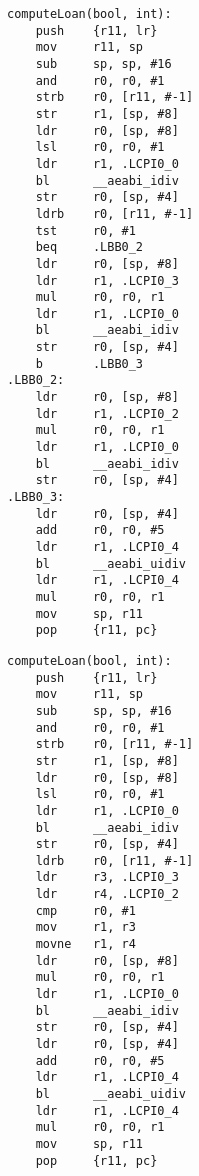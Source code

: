 \begin{minipage}{0.45\textwidth}
    \begin{lstlisting}[style=AsmStyle, basicstyle=\fontsize{4}{5}\selectfont\ttfamily]
computeLoan(bool, int):
    push    {r11, lr}
    mov     r11, sp
    sub     sp, sp, #16
    and     r0, r0, #1
    strb    r0, [r11, #-1]
    str     r1, [sp, #8]
    ldr     r0, [sp, #8]
    lsl     r0, r0, #1
    ldr     r1, .LCPI0_0
    bl      __aeabi_idiv
    str     r0, [sp, #4]
    ldrb    r0, [r11, #-1]
    tst     r0, #1
    beq     .LBB0_2
    ldr     r0, [sp, #8]
    ldr     r1, .LCPI0_3
    mul     r0, r0, r1
    ldr     r1, .LCPI0_0
    bl      __aeabi_idiv
    str     r0, [sp, #4]
    b       .LBB0_3
.LBB0_2:
    ldr     r0, [sp, #8]
    ldr     r1, .LCPI0_2
    mul     r0, r0, r1
    ldr     r1, .LCPI0_0
    bl      __aeabi_idiv
    str     r0, [sp, #4]
.LBB0_3:
    ldr     r0, [sp, #4]
    add     r0, r0, #5
    ldr     r1, .LCPI0_4
    bl      __aeabi_uidiv
    ldr     r1, .LCPI0_4
    mul     r0, r0, r1
    mov     sp, r11
    pop     {r11, pc}
    \end{lstlisting}
\end{minipage}%
\hspace{1cm}
\begin{minipage}{0.45\textwidth}
    \begin{lstlisting}[numbers=right, basicstyle=\fontsize{4}{5}\selectfont\ttfamily\color{white}, belowskip=8.5\baselineskip]
computeLoan(bool, int):
    push    {r11, lr}
    mov     r11, sp
    sub     sp, sp, #16
    and     r0, r0, #1
    strb    r0, [r11, #-1]
    str     r1, [sp, #8]
    ldr     r0, [sp, #8]
    lsl     r0, r0, #1
    ldr     r1, .LCPI0_0
    bl      __aeabi_idiv
    str     r0, [sp, #4]
    ldrb    r0, [r11, #-1]
    ldr     r3, .LCPI0_3
    ldr     r4, .LCPI0_2
    cmp     r0, #1
    mov     r1, r3
    movne   r1, r4
    ldr     r0, [sp, #8]
    mul     r0, r0, r1
    ldr     r1, .LCPI0_0
    bl      __aeabi_idiv
    str     r0, [sp, #4]
    ldr     r0, [sp, #4]
    add     r0, r0, #5
    ldr     r1, .LCPI0_4
    bl      __aeabi_uidiv
    ldr     r1, .LCPI0_4
    mul     r0, r0, r1
    mov     sp, r11
    pop     {r11, pc} 
    \end{lstlisting}
\end{minipage}%
